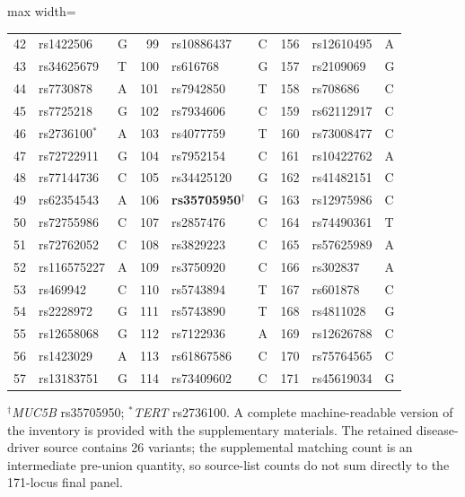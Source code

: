 \begin{table}[!t]
\begin{adjustbox}{max width=\textwidth}
\begin{tabular}{rll@{\hspace{6pt}}rll@{\hspace{6pt}}rll}
42 & rs1422506 & G & 99 & rs10886437 & C & 156 & rs12610495 & A\\
43 & rs34625679 & T & 100 & rs616768 & G & 157 & rs2109069 & G\\
44 & rs7730878 & A & 101 & rs7942850 & T & 158 & rs708686 & C\\
45 & rs7725218 & G & 102 & rs7934606 & C & 159 & rs62112917 & C\\
46 & rs2736100$^{\ast}$ & A & 103 & rs4077759 & T & 160 & rs73008477 & C\\
47 & rs72722911 & G & 104 & rs7952154 & C & 161 & rs10422762 & A\\
48 & rs77144736 & C & 105 & rs34425120 & G & 162 & rs41482151 & C\\
49 & rs62354543 & A & 106 & \textbf{rs35705950}$^{\dagger}$ & G & 163 & rs12975986 & C\\
50 & rs72755986 & C & 107 & rs2857476 & C & 164 & rs74490361 & T\\
51 & rs72762052 & C & 108 & rs3829223 & C & 165 & rs57625989 & A\\
52 & rs116575227 & A & 109 & rs3750920 & C & 166 & rs302837 & A\\
53 & rs469942 & C & 110 & rs5743894 & T & 167 & rs601878 & C\\
54 & rs2228972 & G & 111 & rs5743890 & T & 168 & rs4811028 & G\\
55 & rs12658068 & G & 112 & rs7122936 & A & 169 & rs12626788 & C\\
56 & rs1423029 & A & 113 & rs61867586 & C & 170 & rs75764565 & C\\
57 & rs13183751 & G & 114 & rs73409602 & C & 171 & rs45619034 & G\\
\bottomrule
\end{tabular}
\end{adjustbox}
\vspace{2pt}
\parbox{0.98\textwidth}{\tiny $^{\dagger}$\textit{MUC5B} rs35705950; $^{\ast}$\textit{TERT} rs2736100. A complete machine-readable version of the inventory is provided with the supplementary materials. The retained disease-driver source contains 26 variants; the supplemental matching count is an intermediate pre-union quantity, so source-list counts do not sum directly to the 171-locus final panel.}
\end{table}
